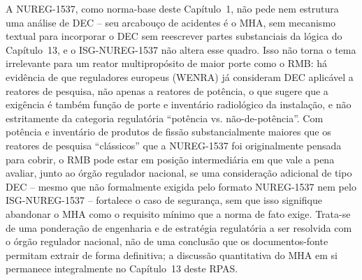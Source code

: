 A NUREG-1537, como norma-base deste Cap\'itulo~1, n\~ao pede nem
estrutura uma an\'alise de DEC -- seu arcabou\c{c}o de acidentes \'e o
MHA, sem mecanismo textual para incorporar o DEC sem reescrever partes
substanciais da l\'ogica do Cap\'itulo~13, e o ISG-NUREG-1537 n\~ao altera esse
quadro. Isso n\~ao torna o tema irrelevante para um reator multiprop\'osito
de maior porte como o RMB: h\'a evid\^encia de que reguladores europeus
(WENRA) j\'a consideram DEC aplic\'avel a reatores de pesquisa, n\~ao
apenas a reatores de pot\^encia, o que sugere que a exig\^encia \'e
tamb\'em fun\c{c}\~ao de porte e invent\'ario radiol\'ogico da
instala\c{c}\~ao, e n\~ao estritamente da categoria regulat\'oria
``pot\^encia vs. n\~ao-de-pot\^encia''. Com pot\^encia e invent\'ario de
produtos de fiss\~ao substancialmente maiores que os reatores de pesquisa
``cl\'assicos'' que a NUREG-1537 foi originalmente pensada para cobrir, o
RMB pode estar em posi\c{c}\~ao intermedi\'aria em que vale a pena avaliar,
junto ao \'org\~ao regulador nacional, se uma considera\c{c}\~ao adicional
de tipo DEC -- mesmo que n\~ao formalmente exigida pelo formato
NUREG-1537 nem pelo ISG-NUREG-1537 -- fortalece o caso de seguran\c{c}a, sem que
isso signifique abandonar o MHA como o requisito m\'inimo que a norma de
fato exige. Trata-se de uma pondera\c{c}\~ao de engenharia e de
estrat\'egia regulat\'oria a ser resolvida com o \'org\~ao regulador
nacional, n\~ao de uma conclus\~ao que os documentos-fonte permitam
extrair de forma definitiva; a discuss\~ao quantitativa do MHA em si
permanece integralmente no Cap\'itulo~13 deste RPAS.
